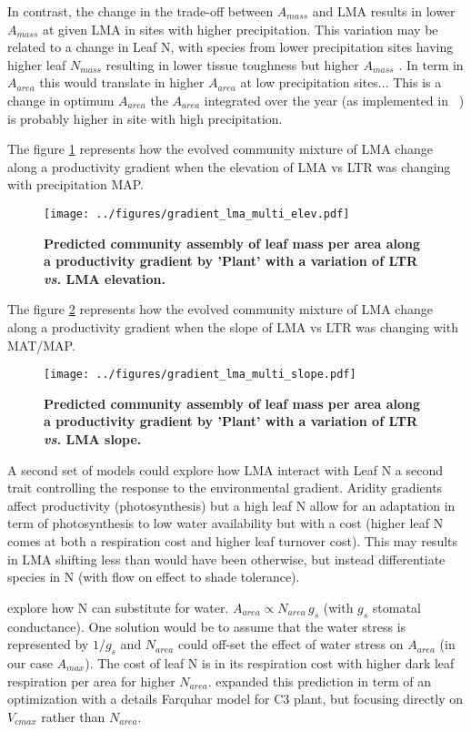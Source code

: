 \documentclass[a4paper,11pt]{article}
\begin{document}
In contrast, the change in the trade-off between $A_{mass}$ and LMA results in lower $A_{mass}$ at given LMA in sites with higher precipitation. This variation may be related to a change in Leaf N, with species from lower precipitation sites having higher leaf $N_{mass}$ resulting in lower tissue toughness but higher $A_{mass}$ \citep{Wright-2002}. In term in $A_{area}$ this would translate in higher $A_{area}$ at low precipitation sites...  This is a change in optimum $A_{area}$ the $A_{area}$ integrated over the year (as implemented in \plant\ ) is probably higher in site with high precipitation.

\clearpage

The figure \ref{fig:lma_map} represents how the evolved community mixture of LMA change along a productivity gradient when the elevation of LMA vs LTR was changing with precipitation MAP.

\begin{figure}[ht]
\centering
\texttt{[image: ../figures/gradient\_lma\_multi\_elev.pdf]}
\caption{\textbf{Predicted community assembly of leaf mass per area along a productivity gradient by 'Plant' with a variation of LTR \textit{vs.} LMA elevation.}
\label{fig:lma_map}}
\end{figure}

The figure \ref{fig:lma_mat_o_map} represents how the evolved community mixture of LMA change along a productivity gradient when the slope of LMA vs LTR was changing with MAT/MAP.

\begin{figure}[ht]
\centering
\texttt{[image: ../figures/gradient\_lma\_multi\_slope.pdf]}
\caption{\textbf{Predicted community assembly of leaf mass per area along a productivity gradient by 'Plant' with a variation of LTR \textit{vs.} LMA slope.}
\label{fig:lma_mat_o_map}}
\end{figure}


\clearpage

A second set of models could explore how LMA interact with Leaf N a second trait controlling the response to the environmental gradient. Aridity gradients affect productivity (photosynthesis) but a
high leaf N allow for an adaptation in term of photosynthesis to low water availability but with a cost (higher leaf N comes at both a respiration cost and higher leaf turnover cost). This may results in LMA shifting less than would have been otherwise, but  instead differentiate species in N (with flow on effect to shade tolerance).


 \citet{Wright-2003} explore how N can substitute for water. $A_{area} \propto N_{area} \, g_s$ (with $g_s$ stomatal conductance). One solution would be to assume that the water stress is represented by $1/g_s$ and $N_{area}$ could off-set the effect of water stress on $A_{area}$ (in our case $A_{max}$). The cost of leaf N is in its respiration cost with higher dark leaf respiration per area for higher $N_{area}$. \citet{Prentice-2014} expanded this prediction in term of an optimization with a details Farquhar model for C3 plant, but focusing directly on $V_{cmax}$ rather than $N_{area}$.
\end{document}
